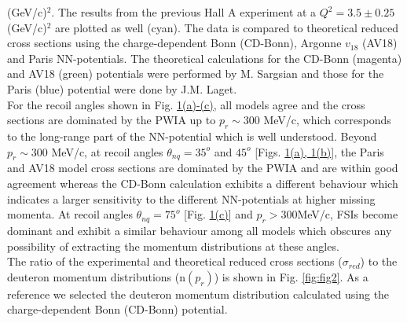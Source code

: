 (GeV/c)$^{2}$. The results from the previous Hall A experiment\cite{PhysRevLett.107.262501} at a $Q^{2}=3.5\pm0.25$ (GeV/c)$^{2}$ are plotted as well (cyan). The data is compared to theoretical reduced
cross sections using the charge-dependent Bonn (CD-Bonn)\cite{PhysRevC.63.024001}, Argonne $v_{18}$ (AV18)\cite{PhysRevC.51.38} and Paris\cite{PhysRevC.21.861} NN-potentials. The theoretical calculations
for the CD-Bonn (magenta) and AV18 (green) potentials were performed by M. Sargsian\cite{PhysRevC.82.014612} and those for the Paris (blue) potential were done by J.M. Laget\cite{LAGET2005}. \\
\indent For the recoil angles shown in Fig. \hyperref[fig:fig1]{1(a)-(c)}, all models agree and the cross sections are dominated by the PWIA up to $p_{r}\sim$300 MeV/c, which corresponds to the long-range part
of the NN-potential which is well understood. Beyond $p_{r}\sim$300 MeV/c, at recoil angles $\theta_{nq}=35^{o}$ and $45^{o}$ [Figs. \hyperref[fig:fig1]{1(a), 1(b)}], the Paris and AV18 model cross sections are dominated by
the PWIA and are within good agreement whereas the CD-Bonn calculation exhibits a different behaviour which indicates a larger sensitivity to the different NN-potentials
at higher missing momenta. At recoil angles $\theta_{nq}=75^{o}$ [Fig. \hyperref[fig:fig1]{1(c)}] and $p_{r}>300$MeV/c, FSIs become dominant and exhibit a similar behaviour among all models which obscures any possibility
of extracting the momentum distributions at these angles. \\
\indent The ratio of the experimental and theoretical reduced cross sections ($\sigma_{red}$) to the deuteron momentum distributions (n$(p_{r})$) is shown in Fig. \ref{fig:fig2}. As a reference we selected the
deuteron momentum distribution calculated using the charge-dependent Bonn (CD-Bonn) potential\cite{PhysRevC.63.024001}.
